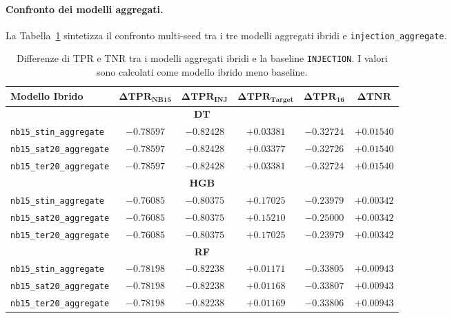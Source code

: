 \paragraph{Confronto dei modelli aggregati.}
La Tabella~\ref{tab:hybrid_vs_base_aggregate_delta} sintetizza il confronto multi-seed tra i tre modelli aggregati ibridi e \texttt{injection\_aggregate}.

\begin{table}[H]
    \centering
    \small
    \caption{Differenze di TPR e TNR tra i modelli aggregati ibridi e la baseline \texttt{INJECTION}. I valori sono calcolati come modello ibrido meno baseline.}
    \label{tab:hybrid_vs_base_aggregate_delta}
    \begin{tabular}{lccccc}
        \toprule
        \textbf{Modello Ibrido} & $\boldsymbol{\Delta TPR_{\text{NB15}}}$ & $\boldsymbol{\Delta TPR_{\text{INJ}}}$ & $\boldsymbol{\Delta TPR_{\text{Target}}}$ & $\boldsymbol{\Delta TPR_{16}}$ & $\boldsymbol{\Delta TNR}$ \\
        \midrule
        \multicolumn{6}{c}{\textbf{DT}} \\
        \hline
        \texttt{nb15\_stin\_aggregate} & $-0.78597$ & $-0.82428$ & $+0.03381$ & $-0.32724$ & $+0.01540$ \\
        \texttt{nb15\_sat20\_aggregate} & $-0.78597$ & $-0.82428$ & $+0.03377$ & $-0.32726$ & $+0.01540$ \\
        \texttt{nb15\_ter20\_aggregate} & $-0.78597$ & $-0.82428$ & $+0.03381$ & $-0.32724$ & $+0.01540$ \\
        \hline
        \multicolumn{6}{c}{\textbf{HGB}} \\
        \hline
        \texttt{nb15\_stin\_aggregate} & $-0.76085$ & $-0.80375$ & $+0.17025$ & $-0.23979$ & $+0.00342$ \\
        \texttt{nb15\_sat20\_aggregate} & $-0.76085$ & $-0.80375$ & $+0.15210$ & $-0.25000$ & $+0.00342$ \\
        \texttt{nb15\_ter20\_aggregate} & $-0.76085$ & $-0.80375$ & $+0.17025$ & $-0.23979$ & $+0.00342$ \\
        \hline
        \multicolumn{6}{c}{\textbf{RF}} \\
        \hline
        \texttt{nb15\_stin\_aggregate} & $-0.78198$ & $-0.82238$ & $+0.01171$ & $-0.33805$ & $+0.00943$ \\
        \texttt{nb15\_sat20\_aggregate} & $-0.78198$ & $-0.82238$ & $+0.01168$ & $-0.33807$ & $+0.00943$ \\
        \texttt{nb15\_ter20\_aggregate} & $-0.78198$ & $-0.82238$ & $+0.01169$ & $-0.33806$ & $+0.00943$ \\
        \bottomrule
    \end{tabular}
\end{table}

